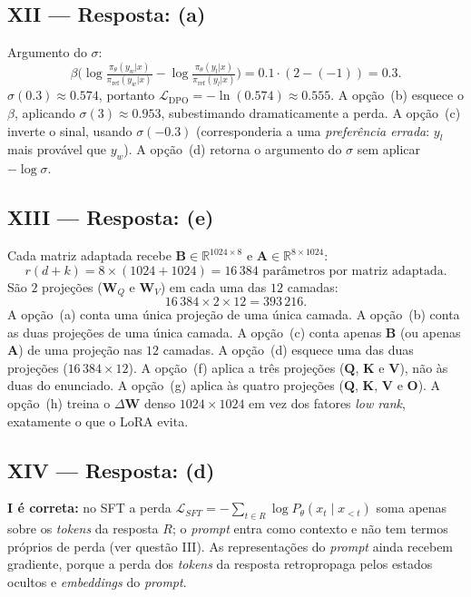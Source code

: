 \documentclass{dlproblemset}
\begin{document}
\subsection*{XII — Resposta: (a)}
Argumento do $\sigma$:
\[
  \beta\big(\log\tfrac{\pi_\theta(y_w|x)}{\pi_{\text{ref}}(y_w|x)}
         - \log\tfrac{\pi_\theta(y_l|x)}{\pi_{\text{ref}}(y_l|x)}\big)
  = 0.1 \cdot (2 - (-1)) = 0.3.
\]
$\sigma(0.3) \approx 0.574$, portanto
$\mathcal{L}_{\text{DPO}} = -\ln(0.574) \approx 0.555$.
A opção~(b) esquece o $\beta$, aplicando $\sigma(3) \approx 0.953$,
subestimando dramaticamente a perda.
A opção~(c) inverte o sinal, usando $\sigma(-0.3)$ (corresponderia a uma
\emph{preferência errada}: $y_l$ mais provável que $y_w$).
A opção~(d) retorna o argumento do $\sigma$ sem aplicar $-\log\sigma$.

\subsection*{XIII — Resposta: (e)}
Cada matriz adaptada recebe $\mathbf{B} \in \mathbb{R}^{1024 \times 8}$ e
$\mathbf{A} \in \mathbb{R}^{8 \times 1024}$:
\[
r(d + k) = 8 \times (1024 + 1024) = 16\,384 \text{ parâmetros por matriz adaptada}.
\]
São $2$ projeções ($\mathbf{W}_Q$ e $\mathbf{W}_V$) em cada uma das $12$ camadas:
\[
16\,384 \times 2 \times 12 = 393\,216.
\]
A opção~(a) conta uma única projeção de uma única camada.
A opção~(b) conta as duas projeções de uma única camada.
A opção~(c) conta apenas $\mathbf{B}$ (ou apenas $\mathbf{A}$) de uma projeção nas $12$ camadas.
A opção~(d) esquece uma das duas projeções ($16\,384 \times 12$).
A opção~(f) aplica a três projeções ($\mathbf{Q}$, $\mathbf{K}$ e $\mathbf{V}$), não às duas do enunciado.
A opção~(g) aplica às quatro projeções ($\mathbf{Q}$, $\mathbf{K}$, $\mathbf{V}$ e $\mathbf{O}$).
A opção~(h) treina o $\Delta\mathbf{W}$ denso $1024 \times 1024$ em vez dos fatores
\textit{low rank}, exatamente o que o LoRA evita.

\subsection*{XIV — Resposta: (d)}
\textbf{I é correta:} no SFT a perda
$\mathcal{L}_{SFT} = -\sum_{t \in R} \log P_\theta(x_t \mid x_{<t})$ soma apenas sobre
os \textit{tokens} da resposta $R$; o \textit{prompt} entra como contexto e não tem
termos próprios de perda (ver questão III). As representações do \textit{prompt} ainda
recebem gradiente, porque a perda dos \textit{tokens} da resposta retropropaga pelos
estados ocultos e \textit{embeddings} do \textit{prompt}.
\end{document}
